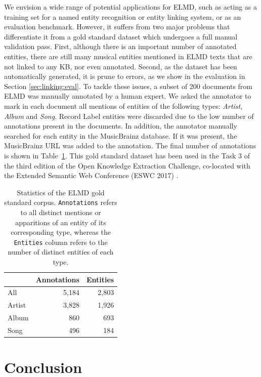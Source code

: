 We envision a wide range of potential applications for \textsc{ELMD}, such as acting as a training set for a named entity recognition or entity linking system, or as an evaluation benchmark. However, it suffers from two major problems that differentiate it from a gold standard dataset which undergoes a full manual validation pass. First, although there is an important number of annotated entities, there are still many musical entities mentioned in \textsc{ELMD} texts that are not linked to any KB, nor even annotated. Second, as the dataset has been automatically generated, it is prune to errors, as we show in the evaluation in Section \ref{sec:linking:eval}. To tackle these issues, a subset of 200 documents from \textsc{ELMD} was manually annotated by a human expert. We asked the annotator to mark in each document all mentions of entities of the following types: \textit{Artist}, \textit{Album} and \textit{Song}. Record Label entities were discarded due to the low number of annotations present in the documents. In addition, the annotator manually searched for each entity in the MusicBrainz database. If it was present, the MusicBrainz URL was added to the annotation. The final number of annotations is shown in Table~\ref{tbl:linking:ELMDGold}.
This gold standard dataset has been used in the Task 3 of the third edition of the Open Knowledge Extraction Challenge, co-located with the Extended Semantic Web Conference (ESWC 2017) \citep{speck2017}.

\begin{table}[]
\centering
\begin{tabular}{l r r }
\hline
& \textbf{Annotations} & \textbf{Entities} \\ \hline
All    & 5,184      & 2,803    \\ 
Artist & 3,828      & 1,926    \\ 
Album  & 860       & 693    \\ 
Song  & 496        & 184     \\ \hline
\end{tabular}
\caption[Statistics of the ELMD gold standard corpus.]{Statistics of the ELMD gold standard corpus. \texttt{Annotations} refers to all distinct mentions or apparitions of an entity of its corresponding type, whereas the \texttt{Entities} column refers to the number of distinct entities of each type.}
\label{tbl:linking:ELMDGold}
\end{table}


\section{Conclusion}
\label{sec:linking:conclusions}

